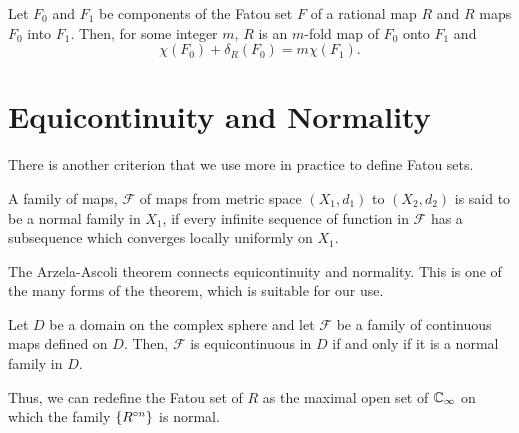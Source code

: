 \begin{theorem}
	Let \( F_0 \) and \( F_1 \) be components of the Fatou set \( F \) of a rational map \( R \)
	and \( R \) maps \( F_0 \) into \( F_1 \). Then, for some integer \( m \), \( R \) is an \( m \)-fold
	map of \( F_0 \) onto \( F_1 \) and \[
		\chi(F_0)+\delta_R(F_0)=m\chi(F_1)
	.\] 
\end{theorem}

\section{Equicontinuity and Normality}
There is another criterion that we use more in practice to define Fatou sets.
\begin{definition}
	A family of maps, \( \mathcal{F} \) of maps from metric space \( (X_1,d_1) \) to \( (X_2,d_2) \) is said to be a normal family in \( X_1 \),
	if every infinite sequence of function in \( \mathcal{F} \) has a subsequence which converges locally uniformly on \( X_1 \).
\end{definition}

The Arzela-Ascoli theorem connects equicontinuity and normality. This is one of the many forms of the theorem, which is suitable for our use.
\begin{AAT}
	Let \( D \) be a domain on the complex sphere and let \( \mathcal{F} \) be a family of continuous maps defined on \( D \).
	Then, \( \mathcal{F} \) is equicontinuous in \( D \) if and only if  it is a normal family in \( D \).
\end{AAT}
Thus, we can redefine the Fatou set of \( R \) as the maximal open set of \( \mathbb{C}_\infty \) 
on which the family \( \{\ror[n]\} \) is normal.

